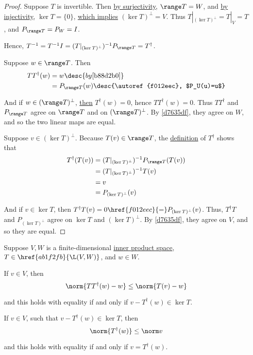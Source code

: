 \begin{proof}
  \def\T{T|_{(\ker T)^\perp}}

   Suppose $T$ is invertible. Then \href{a41ddec}{by surjectivity},
  $\range T=W$, and \href{f68db52}{by injectivity}, $\ker T=\{0\}$,
  \href{fb661b9}{which implies} $(\ker T)^\perp=V$. Thus $\T=T|_V=T$, and
  $P_{\range T}=P_W=I$.

  Hence, $T^{-1}=T^{-1}I=(\T)^{-1}P_{\range T}=T^\dagger$.

   Suppose $w\in\range T$. Then
  \begin{align*}
    TT^\dagger(w) &=w\desc{by \autoref{b88d2b0}}                        \\
                  &=P_{\range T}(w)\desc{\autoref{f012eec}, $P_U(u)=u$}
  \end{align*}

  And if $w\in(\range T)^\perp$, \href{b88d2b0}{then} $T^\dagger(w)=0$, hence
  $TT^\dagger(w)=0$. Thus $TT^\dagger$ and $P_{\range T}$ agree on $\range T$
  and on $(\range T)^\perp$. By \autoref{d7635df}, they agree on $W$, and so
  the two linear maps are equal.

   Suppose $v\in(\ker T)^\perp$. Because $T(v)\in\range T$, the
  \href{ba879e1}{definition} of $T^\dagger$ shows that
  \begin{align*}
    T^\dagger(T(v)) &=(T|_{(\ker T)^\perp})^{-1}P_{\range T}(T(v)) \\
                    &=(T|_{(\ker T)^\perp})^{-1}T(v)               \\
                    &=v                                            \\
                    &=P_{(\ker T)^\perp}(v)
  \end{align*}

  And if $v\in\ker T$, then $T^\dagger T(v)=0\href{f012eec}{=}P_{(\ker
  T)^\perp}(v)$. Thus, $T^\dagger T$ and $P_{(\ker T)^\perp}$ agree on $\ker T$
  and $(\ker T)^\perp$. By \autoref{d7635df}, they agree on $V$, and so they
  are equal.
\end{proof}

\label{cef1297}

Suppose $V,W$ is a finite-dimensional \href{b9935c8}{inner product space},
$T\in\href{ab1f2fb}{\L(V,W)}$, and $w\in W$.
\begin{enumerata}
  \item If $v\in V$, then
  $$
    \norm{TT^\dagger(w)-w}\leq\norm{T(v)-w}
  $$

  and this holds with equality if and only if $v-T^\dagger(w)\in\ker T$.
  \item If $v\in V$, such that $v-T^\dagger(w)\in\ker T$, then
  $$
    \norm{T^\dagger(w)}\leq\norm v
  $$

  and this holds with equality if and only if $v=T^\dagger(w)$.
\end{enumerata}

